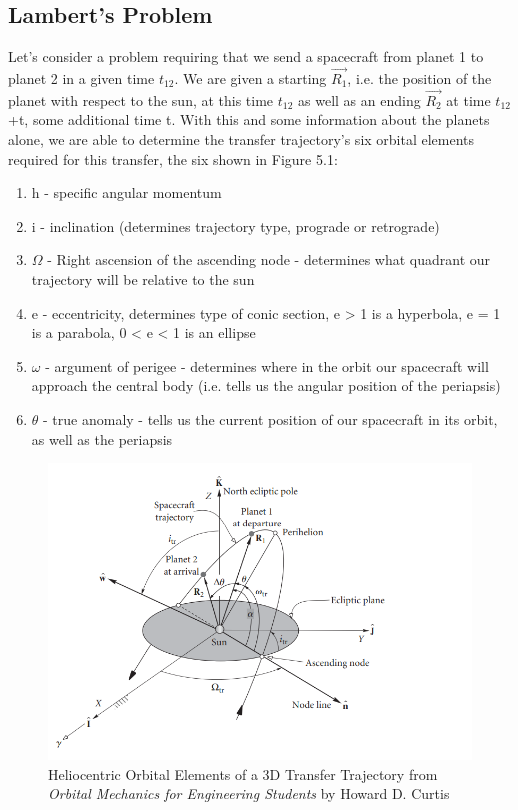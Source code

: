 \documentclass{article}
\numberwithin{figure}{section}
\begin{document}
\subsection*{Lambert's Problem}
Let's consider a problem requiring that we send a spacecraft from planet 1 to planet 2 in a given time \(t_\text{12}\). We are given a starting \(\vec{R_1}\), i.e. the position of the planet with respect to the sun, at this time \(t_\text{12}\) as well as an ending \(\vec{R_2}\) at time \(t_12\)+t, some additional time t. With this and some information about the planets alone, we are able to determine the transfer trajectory's six orbital elements required for this transfer, the six shown in Figure 5.1: 
\begin{enumerate}
    \item h - specific angular momentum
    \item i - inclination (determines trajectory type, prograde or retrograde)
    \item \(\Omega\) - Right ascension of the ascending node - determines what quadrant our trajectory will be relative to the sun
    \item e - eccentricity, determines type of conic section, e > 1 is a hyperbola, e = 1 is a parabola, 0 < e < 1 is an ellipse
    \item \(\omega\) - argument of perigee - determines where in the orbit our spacecraft will approach the central body (i.e. tells us the angular position of the periapsis)
    \item \(\theta\) - true anomaly - tells us the current position of our spacecraft in its orbit, as well as the periapsis
\end{enumerate}

\begin{figure}
    \centering
    \includegraphics[width=0.5\linewidth]{orbital elements.png}
    \caption{Heliocentric Orbital Elements of a 3D Transfer Trajectory from \textit{Orbital Mechanics for Engineering Students} by Howard D. Curtis}
    \label{fig:enter-label}
\end{figure}
\end{document}
